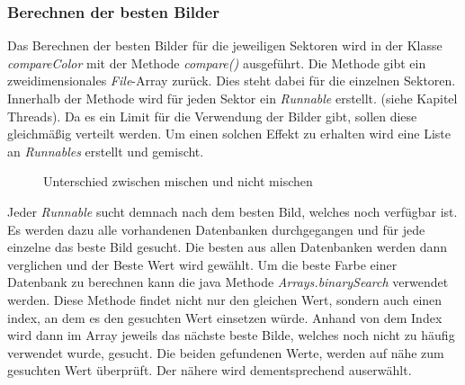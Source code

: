 \newpage

\subsubsection{Berechnen der besten Bilder}
Das Berechnen der besten Bilder für die jeweiligen Sektoren wird in der Klasse \textit{compareColor} mit der Methode \textit{compare()} ausgeführt. Die Methode gibt ein zweidimensionales \textit{File}-Array zurück. Dies steht dabei für die einzelnen Sektoren. Innerhalb der Methode wird für jeden Sektor ein \textit{Runnable} erstellt. (siehe Kapitel Threads). Da es ein Limit für die Verwendung der Bilder gibt, sollen diese gleichmäßig verteilt werden. Um einen solchen Effekt zu erhalten wird eine Liste an \textit{Runnables} erstellt und gemischt.

\begin{figure}[h]
    \centering
    \caption[Beste Bilder]{Unterschied zwischen mischen und nicht mischen}
\end{figure}

\begin{sloppypar}
Jeder \textit{Runnable} sucht demnach nach dem besten Bild, welches noch verfügbar ist. Es werden dazu alle vorhandenen Datenbanken durchgegangen und für jede einzelne das beste Bild gesucht. Die besten aus allen Datenbanken werden dann verglichen und der Beste Wert wird gewählt. Um die beste Farbe einer Datenbank zu berechnen kann die java Methode \textit{Arrays.binarySearch} verwendet werden. Diese Methode findet nicht nur den gleichen Wert, sondern auch einen index, an dem es den gesuchten Wert einsetzen würde. Anhand von dem Index wird dann im Array jeweils das nächste beste Bilde, welches noch nicht zu häufig verwendet wurde, gesucht. Die beiden gefundenen Werte, werden auf nähe zum gesuchten Wert überprüft. Der nähere wird dementsprechend auserwählt.
\end{sloppypar}

